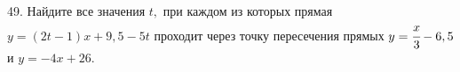 49. Найдите все значения $t,$ при каждом из которых прямая $y=(2t-1)x+9,5-5t$ проходит через точку пересечения прямых $y=\cfrac{x}{3}-6,5$ и $y=-4x+26.$\\
